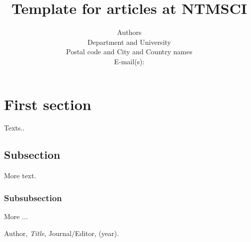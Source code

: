 \documentclass{article}
\title{Template for articles at NTMSCI}
\author{Authors\\
  \small Department  and University\\
  \small Postal code and City and Country names\\
  \small E-mail(s):
}
\theoremstyle{definition}
\theoremstyle{remark}
\begin{document}
\maketitle


\section{First section}

Texts..

\subsection{Subsection}\label{sec:nothing}

More text.

\subsubsection{Subsubsection}\label{sec:nothing2}

More ...

\begin{thebibliography}{99}

 Author, \emph{Title}, Journal/Editor, (year).

\end{thebibliography}
\end{document}
